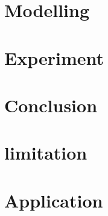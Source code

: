 \documentclass[10pt,twocolumn,letterpaper]{article}
\begin{document}
\section{Modelling}

\section{Experiment}

\section{Conclusion}

\section{limitation}

\section{Application}
\end{document}
